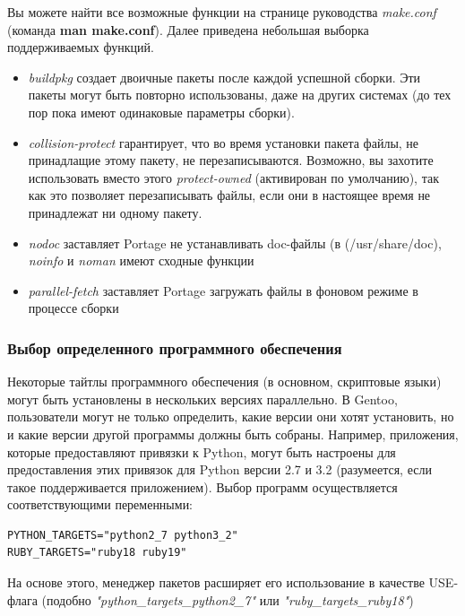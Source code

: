 \documentclass[10pt]{book}
\begin{document}
Вы можете найти все возможные функции на странице руководства \textit{make.conf} (команда \textbf{man make.conf}). Далее приведена небольшая выборка поддерживаемых функций.

\begin{itemize}
\item \textit{buildpkg} создает двоичные пакеты после каждой успешной сборки. Эти пакеты могут быть повторно использованы, даже на других системах (до тех пор пока имеют одинаковые параметры сборки).

\item \textit{collision-protect} гарантирует, что во время установки пакета файлы, не принадлащие этому пакету, не перезаписываются. Возможно, вы захотите использовать вместо этого \textit{protect-owned} (активирован по умолчанию), так как это позволяет перезаписывать файлы, если они в настоящее время не принадлежат ни одному пакету.

\item \textit{nodoc} заставляет Portage не устанавливать doc-файлы (в (/usr/share/doc), \textit{noinfo} и \textit{noman} имеют сходные функции

\item \textit{parallel-fetch} заставляет Portage загружать файлы в фоновом режиме в процессе сборки
\end{itemize}

\subsubsection{Выбор определенного программного обеспечения}

Некоторые тайтлы программного обеспечения (в основном, скриптовые языки) могут быть установлены в нескольких версиях параллельно. В Gentoo, пользователи могут не только определить, какие версии они хотят установить, но и какие версии другой программы должны быть собраны. Например, приложения, которые предоставляют привязки к Python, могут быть настроены для предоставления этих привязок для Python версии 2.7 и 3.2 (разумеется, если такое поддерживается приложением). Выбор программ осуществляется соответствующими переменными:

\begin{tcolorbox}
\begin{lstlisting}
PYTHON_TARGETS="python2_7 python3_2"
RUBY_TARGETS="ruby18 ruby19"
\end{lstlisting}
\end{tcolorbox}

На основе этого, менеджер пакетов расширяет его использование в качестве USE-флага (подобно \textit{"python\_targets\_python2\_7"} или \textit{"ruby\_targets\_ruby18"})
\end{document}
